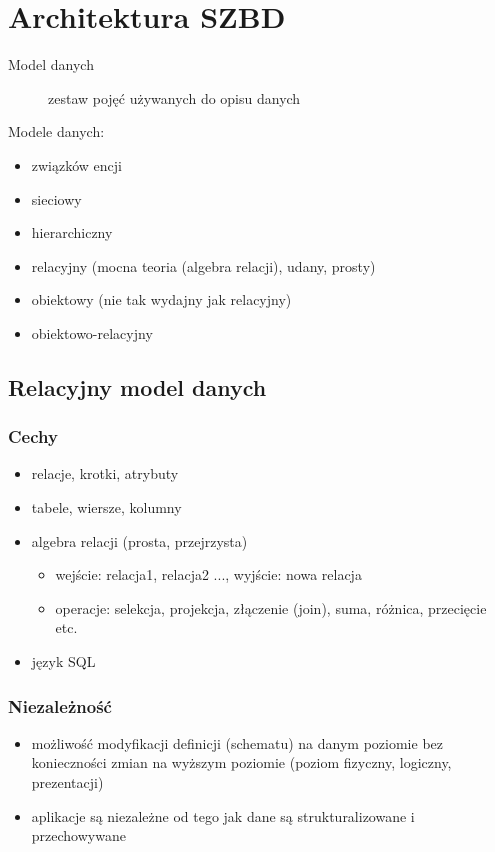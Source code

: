 \documentclass[12pt]{article}
\begin{document}
\section{Architektura SZBD}

\begin{description}
\item[Model danych] zestaw pojęć używanych do opisu danych
\end{description}

Modele danych:
\begin{itemize}
\item związków encji
\item sieciowy
\item hierarchiczny
\item relacyjny (mocna teoria (algebra relacji), udany, prosty)
\item obiektowy (nie tak wydajny jak relacyjny)
\item obiektowo-relacyjny
\end{itemize}

\subsection{Relacyjny model danych}
\subsubsection{Cechy}

\begin{itemize}
\item relacje, krotki, atrybuty
\item tabele, wiersze, kolumny
\item algebra relacji (prosta, przejrzysta)
\begin{itemize}
\item wejście: relacja1, relacja2 ..., wyjście: nowa relacja
\item operacje: selekcja, projekcja, złączenie (join), suma, różnica, przecięcie etc.
\end{itemize}
\item język SQL
\end{itemize}

\subsubsection{Niezależność}
\begin{itemize}
\item możliwość modyfikacji definicji (schematu) na danym poziomie bez konieczności zmian na wyższym poziomie
   (poziom fizyczny, logiczny, prezentacji)
\item aplikacje są niezależne od tego jak dane są strukturalizowane i przechowywane
\end{itemize}
\end{document}
